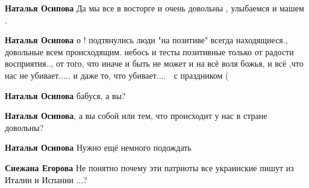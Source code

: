 \begin{itemize}
\begin{itemize}
\textbf{Наталья Осипова} Да мы все в восторге и очень довольны , улыбаемся и машем .

 
\textbf{Наталья Осипова} о ! подтянулись люди "на позитиве" всегда находящиеся., довольные всем происходящим.
небось и тесты позитивные только от радости восприятия.., от того, что иначе и быть не может и на всё воля божья, и всё ,что нас не убивает.....
и даже то, что убивает....
🥴 с праздником (

 
\textbf{Наталья Осипова} бабуся, а вы?

 
\textbf{Наталья Осипова}, а вы собой или тем, что происходит у нас в стране довольны?

 
\textbf{Наталья Осипова} Нужно ещё немного подождать\Laughey[1.0][white]

 
\textbf{Снежана Егорова} Не понятно почему эти патриоты все украинские пишут из Италии и Испании ...?

 

\end{itemize}
\end{itemize}
